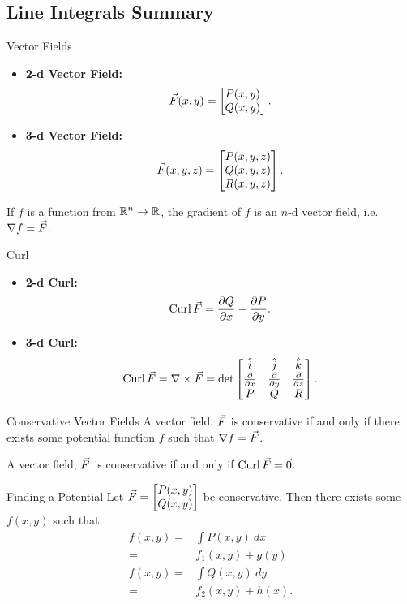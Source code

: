 \renewcommand\thesubsection{\thesection.\Alph{subsection}}
\setcounter{subsection}{18}
\subsection{Line Integrals Summary}
\begin{definition}{Vector Fields}
\begin{itemize}
\item \textbf{2-d Vector Field:} $$\vec{F}(x,y)=\begin{bmatrix}P(x,y)\\Q(x,y)\end{bmatrix}. $$
\item \textbf{3-d Vector Field:}$$\vec{F}(x,y,z)=\begin{bmatrix}P(x,y,z)\\Q(x,y,z)\\R(x,y,z)\end{bmatrix}. $$
\end{itemize}
If $f$ is a function from $\mathbb{R}^n\to\mathbb{R}$, the gradient of $f$ is an $n$-d vector field, i.e. $\nabla f=\vec{F}$.
\end{definition}

\begin{definition}{Curl}
\begin{itemize}
\item \textbf{2-d Curl:} $$\operatorname{Curl} \vec{F}=\frac{\partial Q}{\partial x}-\frac{\partial P}{\partial y}.$$
\item \textbf{3-d Curl:} $$\operatorname{Curl} \vec{F}=\nabla\times\vec{F} =\det\begin{bmatrix}\hat{i} & \hat{j} & \hat{k} \\ \frac{\partial }{\partial x} & \frac{\partial }{\partial y} & \frac{\partial}{\partial z}\\ P&Q&R\end{bmatrix}.$$ 
\end{itemize}
\end{definition}

\begin{definition}{Conservative Vector Fields}
A vector field, $\vec{F}$ is conservative if and only if there exists some potential function $f$ such that $\nabla f=\vec{F}$.

\vspace{1em}

A vector field, $\vec{F}$ is conservative if and only if $\operatorname{Curl}\vec{F}=\vec{0}$.
\end{definition}

\begin{definition}{Finding a Potential}
Let $\vec{F}=\begin{bmatrix}P(x,y)\\Q(x,y)\end{bmatrix}$ be conservative. Then there exists some $f(x,y)$ such that:
\begin{align*}
f(x,y)=&\int P(x,y)\ dx\\
=&f_1(x,y)+g(y)\\
f(x,y)=&\int Q(x,y)\ dy\\
=&f_2(x,y)+h(x).
\end{align*}
\end{definition}

